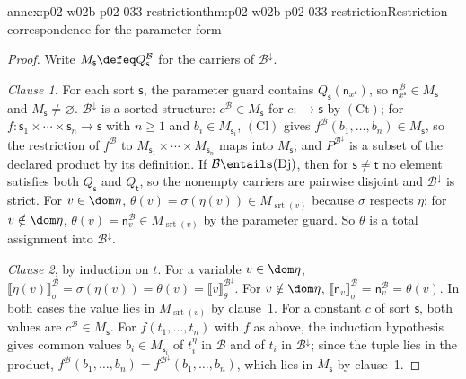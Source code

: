\begin{annexitem}{annex:p02-w02b-p02-033-restriction}{thm:p02-w02b-p02-033-restriction}{Restriction correspondence for the parameter form}
\begin{proof}
Write \(M_{\mathsf s}\defeq Q_{\mathsf s}^{\mathcal B}\) for the carriers of
\(\mathcal B^{\downarrow}\).

\emph{Clause 1.}  For each sort \(\mathsf s\), the parameter guard contains
\(Q_{\mathsf s}(\mathsf n_{x^{\mathsf s}})\), so
\(\mathsf n_{x^{\mathsf s}}^{\mathcal B}\in M_{\mathsf s}\) and
\(M_{\mathsf s}\ne\varnothing\).  \(\mathcal B^{\downarrow}\) is a sorted
structure: \(c^{\mathcal B}\in M_{\mathsf s}\) for \(c:\longrightarrow
\mathsf s\) by \((\mathrm{Ct})\); for
\(f:\mathsf s_1\times\cdots\times\mathsf s_n\longrightarrow\mathsf s\) with
\(n\geq1\) and \(b_i\in M_{\mathsf s_i}\), \((\mathrm{Cl})\) gives
\(f^{\mathcal B}(b_1,\ldots,b_n)\in M_{\mathsf s}\), so the restriction of
\(f^{\mathcal B}\) to \(M_{\mathsf s_1}\times\cdots\times M_{\mathsf s_n}\)
maps into \(M_{\mathsf s}\); and \(P^{\mathcal B^{\downarrow}}\) is a subset
of the declared product by its definition.  If
\(\mathcal B\entails(\mathrm{Dj})\), then for \(\mathsf s\ne\mathsf t\) no
element satisfies both \(Q_{\mathsf s}\) and \(Q_{\mathsf t}\), so the
nonempty carriers are pairwise disjoint and \(\mathcal B^{\downarrow}\) is
strict.  For \(v\in\dom\eta\),
\(\theta(v)=\sigma(\eta(v))\in M_{\operatorname{srt}(v)}\) because \(\sigma\)
respects \(\eta\); for \(v\notin\dom\eta\),
\(\theta(v)=\mathsf n_v^{\mathcal B}\in M_{\operatorname{srt}(v)}\) by the
parameter guard.  So \(\theta\) is a total assignment into
\(\mathcal B^{\downarrow}\).

\emph{Clause 2}, by induction on \(t\).  For a variable \(v\in\dom\eta\),
\(\llbracket\eta(v)\rrbracket^{\mathcal B}_{\sigma}=\sigma(\eta(v))=
\theta(v)=\llbracket v\rrbracket^{\mathcal B^{\downarrow}}_{\theta}\).  For
\(v\notin\dom\eta\),
\(\llbracket\mathsf n_v\rrbracket^{\mathcal B}_{\sigma}=
\mathsf n_v^{\mathcal B}=\theta(v)\).  In both cases the value lies in
\(M_{\operatorname{srt}(v)}\) by clause~1.  For a constant \(c\) of sort
\(\mathsf s\), both values are \(c^{\mathcal B}\in M_{\mathsf s}\).  For
\(f(t_1,\ldots,t_n)\) with \(f\) as above, the induction hypothesis gives
common values \(b_i\in M_{\mathsf s_i}\) of \(t_i^{\eta}\) in \(\mathcal B\)
and of \(t_i\) in \(\mathcal B^{\downarrow}\); since the tuple lies in the
product, \(f^{\mathcal B}(b_1,\ldots,b_n)=
f^{\mathcal B^{\downarrow}}(b_1,\ldots,b_n)\), which lies in
\(M_{\mathsf s}\) by clause~1.


\end{proof}
\end{annexitem}
